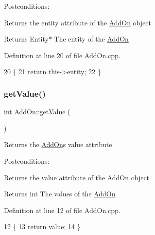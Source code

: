 Postconditions\+:
\begin{DoxyItemize}
\item Returns the entity attribute of the \hyperlink{classAddOn}{Add\+On} object
\end{DoxyItemize}

\begin{DoxyReturn}{Returns}
Entity$\ast$ The entity of the \hyperlink{classAddOn}{Add\+On} 
\end{DoxyReturn}


Definition at line 20 of file Add\+On.\+cpp.


\begin{DoxyCode}
20                          \{
21     \textcolor{keywordflow}{return} this->entity;
22 \}
\end{DoxyCode}
\mbox{\label{classAddOn_a776b1f929793e8387cb0b58fc7aba2c2}} 
\subsubsection{\texorpdfstring{get\+Value()}{getValue()}}
{\footnotesize\ttfamily int Add\+On\+::get\+Value (\begin{DoxyParamCaption}{ }\end{DoxyParamCaption})}



Returns the \hyperlink{classAddOn}{Add\+On}\textquotesingle{}s value attribute. 

Postconditions\+:
\begin{DoxyItemize}
\item Returns the value attribute of the \hyperlink{classAddOn}{Add\+On} object
\end{DoxyItemize}

\begin{DoxyReturn}{Returns}
int The values of the \hyperlink{classAddOn}{Add\+On} 
\end{DoxyReturn}


Definition at line 12 of file Add\+On.\+cpp.


\begin{DoxyCode}
12                     \{
13     \textcolor{keywordflow}{return} value;
14 \}
\end{DoxyCode}
\mbox{\label{classAddOn_ac9f4263e3558015fdad46adefceed197}} 

